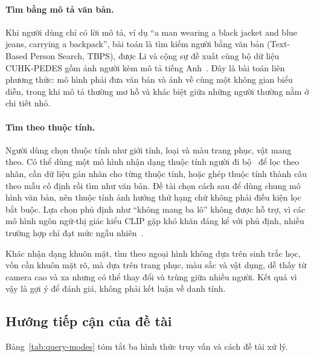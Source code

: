 \paragraph{Tìm bằng mô tả văn bản.} Khi người dùng chỉ có lời mô tả, ví dụ ``a man wearing a black jacket and blue jeans, carrying a backpack'', bài toán là tìm kiếm người bằng văn bản (Text-Based Person Search, TBPS), được Li và cộng sự đề xuất cùng bộ dữ liệu CUHK-PEDES gồm ảnh người kèm mô tả tiếng Anh~\cite{li2017cuhkpedes}. Đây là bài toán liên phương thức: mô hình phải đưa văn bản và ảnh về cùng một không gian biểu diễn, trong khi mô tả thường mơ hồ và khác biệt giữa những người thường nằm ở chi tiết nhỏ.

\paragraph{Tìm theo thuộc tính.} Người dùng chọn thuộc tính như giới tính, loại và màu trang phục, vật mang theo. Có thể dùng một mô hình nhận dạng thuộc tính người đi bộ~\cite{wang2022parsurvey} để lọc theo nhãn, cần dữ liệu gán nhãn cho từng thuộc tính, hoặc ghép thuộc tính thành câu theo mẫu cố định rồi tìm như văn bản. Đề tài chọn cách sau để dùng chung mô hình văn bản, nên thuộc tính ảnh hưởng thứ hạng chứ không phải điều kiện lọc bắt buộc. Lựa chọn phủ định như ``không mang ba lô'' không được hỗ trợ, vì các mô hình ngôn ngữ-thị giác kiểu CLIP gặp khó khăn đáng kể với phủ định, nhiều trường hợp chỉ đạt mức ngẫu nhiên~\cite{alhamoud2025negation}.

Khác nhận dạng khuôn mặt, tìm theo ngoại hình không dựa trên sinh trắc học, vốn cần khuôn mặt rõ, mà dựa trên trang phục, màu sắc và vật dụng, dễ thấy từ camera cao và xa nhưng có thể thay đổi và trùng giữa nhiều người. Kết quả vì vậy là gợi ý để đánh giá, không phải kết luận về danh tính.

\subsection{Hướng tiếp cận của đề tài}
\label{sec:3.1.6}

Bảng~\ref{tab:query-modes} tóm tắt ba hình thức truy vấn và cách đề tài xử lý.

